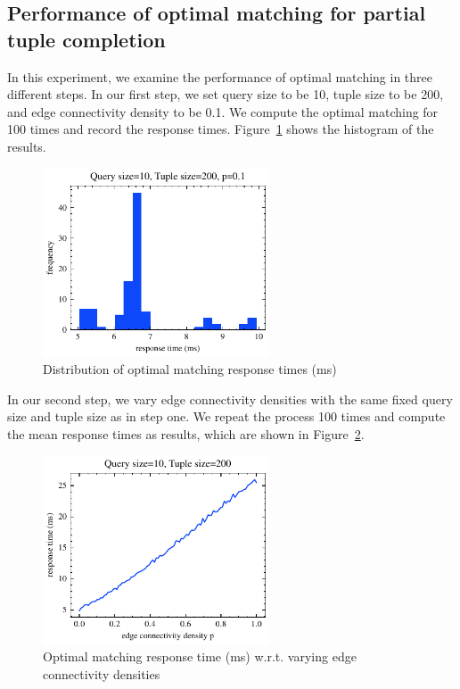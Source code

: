\documentclass[conference]{IEEEtran}
\begin{document}
\subsection{Performance of optimal matching for partial tuple completion}
In this experiment, we examine the performance of optimal matching in three different steps.
In our first step, we set query size to be 10, tuple size to be 200, and edge connectivity density to be 0.1. We compute the optimal matching for 100 times and record the response times. Figure~\ref{fig:tuple_completion_1} shows the histogram of the results.
\begin{figure}[!th]
	\centering
	\includegraphics[width=0.6\textwidth]{graphics/tuple_completion_1.pdf}
	\caption{Distribution of optimal matching response times (ms)}
	\label{fig:tuple_completion_1}
\end{figure}
In our second step, we vary edge connectivity densities with the same fixed query size and tuple size as in step one. We repeat the process 100 times and compute the mean response times as results, which are shown in Figure~\ref{fig:tuple_completion_2}.
\begin{figure}[!th]
	\centering
	\includegraphics[width=0.6\textwidth]{graphics/tuple_completion_2.pdf}
	\caption{Optimal matching response time (ms) w.r.t. varying edge connectivity densities}
	\label{fig:tuple_completion_2}
\end{figure}
\end{document}
